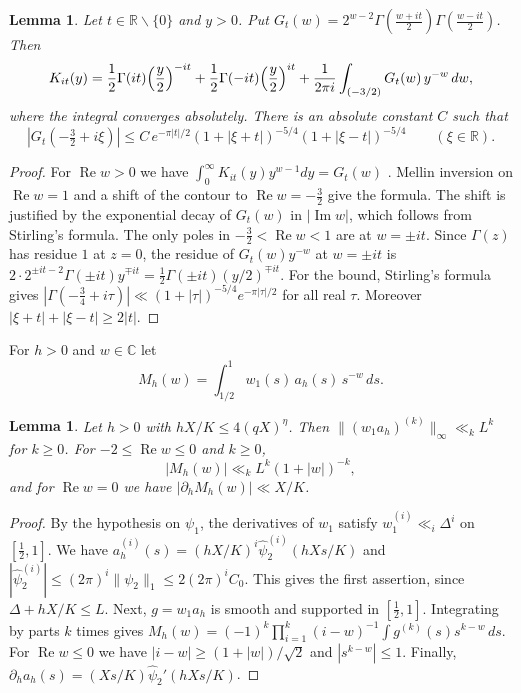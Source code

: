 \documentclass[11pt]{amsart}
\newtheorem{lemma}[theorem]{Lemma}
\theoremstyle{remark}
\theoremstyle{definition}
\numberwithin{equation}{section}
\newcommand{\R}{\mathbb{R}}
\newcommand{\C}{\mathbb{C}}
\begin{document}
\begin{lemma}\label{lem:MB}
Let $t\in\R\smallsetminus\{0\}$ and $y>0$. Put $G_t(w)=2^{w-2}\Gamma(\frac{w+it}2)\Gamma(\frac{w-it}2)$. Then
\[
K_{it}(y)=\frac12\Gamma(it)\Bigl(\frac y2\Bigr)^{-it}+\frac12\Gamma(-it)\Bigl(\frac y2\Bigr)^{it}+\frac1{2\pi i}\int_{(-3/2)}G_t(w)\,y^{-w}\,dw,
\]
where the integral converges absolutely. There is an absolute constant $C$ such that
\[
|G_t(-\tfrac32+i\xi)|\le C\,e^{-\pi|t|/2}(1+|\xi+t|)^{-5/4}(1+|\xi-t|)^{-5/4}\qquad(\xi\in\R).
\]
\end{lemma}

\begin{proof}
For $\operatorname{Re}w>0$ we have $\int_0^\infty K_{it}(y)y^{w-1}dy=G_t(w)$ \cite[6.561.16]{GR}. Mellin inversion on $\operatorname{Re}w=1$ and a shift of the contour to $\operatorname{Re}w=-\frac32$ give the formula. The shift is justified by the exponential decay of $G_t(w)$ in $|\operatorname{Im}w|$, which follows from Stirling's formula. The only poles in $-\frac32<\operatorname{Re}w<1$ are at $w=\pm it$. Since $\Gamma(z)$ has residue $1$ at $z=0$, the residue of $G_t(w)y^{-w}$ at $w=\pm it$ is $2\cdot2^{\pm it-2}\Gamma(\pm it)y^{\mp it}=\frac12\Gamma(\pm it)(y/2)^{\mp it}$. For the bound, Stirling's formula gives $|\Gamma(-\frac34+i\tau)|\ll(1+|\tau|)^{-5/4}e^{-\pi|\tau|/2}$ for all real $\tau$. Moreover $|\xi+t|+|\xi-t|\ge2|t|$.
\end{proof}

For $h>0$ and $w\in\C$ let
\[
M_h(w)=\int_{1/2}^1w_1(s)\,a_h(s)\,s^{-w}\,ds.
\]

\begin{lemma}\label{lem:Mh}
Let $h>0$ with $hX/K\le4(qX)^\eta$. Then $\|(w_1a_h)^{(k)}\|_\infty\ll_kL^k$ for $k\ge0$. For $-2\le\operatorname{Re}w\le0$ and $k\ge0$,
\[
|M_h(w)|\ll_kL^k(1+|w|)^{-k},
\]
and for $\operatorname{Re}w=0$ we have $|\partial_hM_h(w)|\ll X/K$.
\end{lemma}

\begin{proof}
By the hypothesis on $\psi_1$, the derivatives of $w_1$ satisfy $w_1^{(i)}\ll_i\Delta^i$ on $[\frac12,1]$. We have $a_h^{(i)}(s)=(hX/K)^i\hat\psi_2^{(i)}(hXs/K)$ and $|\hat\psi_2^{(i)}|\le(2\pi)^i\|\psi_2\|_1\le2(2\pi)^iC_0$. This gives the first assertion, since $\Delta+hX/K\le L$. Next, $g=w_1a_h$ is smooth and supported in $[\frac12,1]$. Integrating by parts $k$ times gives $M_h(w)=(-1)^k\prod_{i=1}^k(i-w)^{-1}\int g^{(k)}(s)s^{k-w}\,ds$. For $\operatorname{Re}w\le0$ we have $|i-w|\ge(1+|w|)/\sqrt2$ and $|s^{k-w}|\le1$. Finally, $\partial_ha_h(s)=(Xs/K)\hat\psi_2'(hXs/K)$.
\end{proof}
\end{document}
